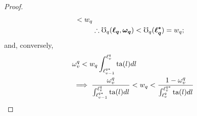 \documentclass[hidelinks, nonatbib]{elsarticle}
\begin{document}
\begin{lemma}
\begin{proof}
\begin{align}
{{                }
            }
            <
            w_q
            \\
            &\therefore
            \mho_{q}(
                \boldsymbol{\ell_q}
                ,\boldsymbol{\omega_q}
            ) 
            <
            \mho_{q}(
                \boldsymbol{\ell_{q}^{*}}
            )
            =
            w_q
            ;
        \end{align}
        and, conversely, 
        \begin{align}
            &
            \omega_{v}^{q} < 
            w_q
            \int_{
                \ell_{v-1}^{q*}
            }^{
                \ell_{v}^{q}
            }{
                \ta(l)dl
            }
            \\
            &\implies
            \frac{
                \omega_{v}^{q}
            }{
                \int_{
                    \ell_{v-1}^{q*}
                }^{
                    \ell_{v}^{q}
                }
                \ta(l)dl
            }
            < 
            w_q
            <
            \frac{
                1-\omega_{v}^{q}
            }{
                \int_{
                    \ell_{v}^{q}
                }^{
                    \ell_{v}^{q*}
                }
                \ta(l)dl
            }

\end{align}
\end{proof}
\end{lemma}
\end{document}
